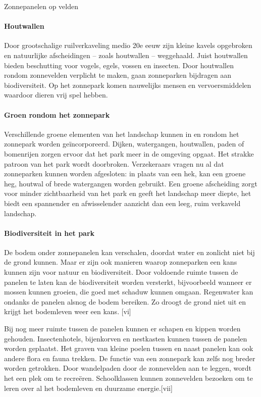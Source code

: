 \begin{voorstel}{Zonnepanelen op velden}
\begin{multicols}{2}
\begin{overwegingen}
\paragraph{Houtwallen}
Door grootschalige ruilverkaveling medio 20e eeuw zijn kleine kavels opgebroken en natuurlijke afscheidingen – zoals houtwallen – weggehaald. Juist houtwallen bieden beschutting voor vogels, egels, vossen en insecten. Door houtwallen rondom zonnevelden verplicht te maken, gaan zonneparken bijdragen aan biodiversiteit. Op het zonnepark komen nauwelijks mensen en vervoersmiddelen waardoor dieren vrij spel hebben.

\paragraph{Groen rondom het zonnepark}
Verschillende groene elementen van het landschap kunnen in en rondom het zonnepark worden geïncorporeerd. Dijken, watergangen, houtwallen, paden of bomenrijen zorgen ervoor dat het park meer in de omgeving opgaat. Het strakke patroon van het park wordt doorbroken. Verzekeraars vragen nu al dat zonneparken kunnen worden afgesloten: in plaats van een hek, kan een groene heg, houtwal of brede watergangen worden gebruikt. Een groene afscheiding zorgt voor minder zichtbaarheid van het park en geeft het landschap meer diepte, het biedt een spannender en afwisselender aanzicht dan een leeg, ruim verkaveld landschap.

\paragraph{Biodiversiteit in het park}
De bodem onder zonnepanelen kan verschalen, doordat water en zonlicht niet bij de grond kunnen. Maar er zijn ook manieren waarop zonneparken een kans kunnen zijn voor natuur en biodiversiteit. Door voldoende ruimte tussen de panelen te laten kan de biodiversiteit worden versterkt, bijvoorbeeld wanneer er mossen kunnen groeien, die goed met schaduw kunnen omgaan. Regenwater kan ondanks de panelen alsnog de bodem bereiken. Zo droogt de grond niet uit en krijgt het bodemleven weer een kans. [vi]

Bij nog meer ruimte tussen de panelen kunnen er schapen en kippen worden gehouden. Insectenhotels, bijenkorven en nestkasten kunnen tussen de panelen worden geplaatst. Het graven van kleine poelen tussen en naast panelen kan ook andere flora en fauna trekken. De functie van een zonnepark kan zelfs nog breder worden getrokken. Door wandelpaden door de zonnevelden aan te leggen, wordt het een plek om te recreëren. Schoolklassen kunnen zonnevelden bezoeken om te leren over al het bodemleven en duurzame energie.[vii]


\end{overwegingen}
\end{multicols}
\end{voorstel}
